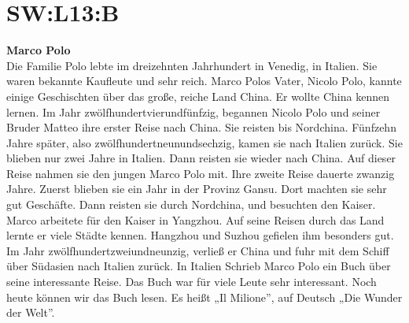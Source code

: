 \section{SW:L13:B}
\noindent
\textbf{Marco Polo} \\
Die Familie Polo lebte im dreizehnten Jahrhundert in Venedig, in Italien.
Sie waren bekannte Kaufleute und sehr reich.
Marco Polos Vater, Nicolo Polo, kannte einige Geschischten über das große, reiche Land China.
Er wollte China kennen lernen.
Im Jahr zwölfhundertvierundfünfzig, begannen Nicolo Polo und seiner Bruder Matteo ihre erster Reise nach China.
Sie reisten bis Nordchina.
Fünfzehn Jahre später, also zwölfhundertneunundsechzig, kamen sie nach Italien zurück.
Sie blieben nur zwei Jahre in Italien. Dann reisten sie wieder nach China.
Auf dieser Reise nahmen sie den jungen Marco Polo mit.
Ihre zweite Reise dauerte zwanzig Jahre. Zuerst blieben sie ein Jahr in der Provinz Gansu.
Dort machten sie sehr gut Geschäfte. Dann reisten sie durch Nordchina, und
besuchten den Kaiser. Marco arbeitete für den Kaiser in Yangzhou.
Auf seine Reisen durch das Land lernte er viele Städte kennen.
Hangzhou und Suzhou gefielen ihm besonders gut.
Im Jahr zwölfhundertzweiundneunzig, verließ er China und fuhr mit dem Schiff über Südasien nach Italien zurück. 
In Italien Schrieb Marco Polo ein Buch über seine interessante Reise.
Das Buch war für viele Leute sehr interessant. Noch heute können wir das Buch lesen.
Es heißt „Il Milione”, auf Deutsch „Die Wunder der Welt”.

